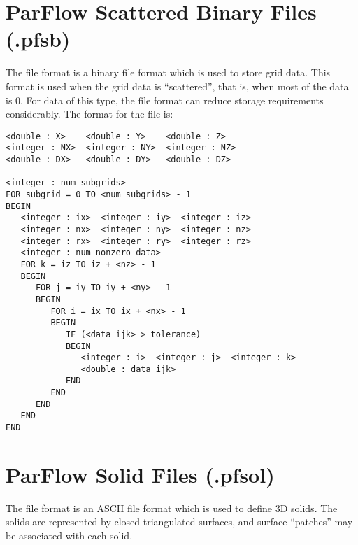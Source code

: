 
\section{ParFlow Scattered Binary Files (.pfsb)}
\label{ParFlow Scattered Binary Files (.pfsb)}

The  file format is a binary file format which is used
to store \parflow{} grid data.
This format is used when the grid data is ``scattered'', that is,
when most of the data is 0.
For data of this type, the  file format can reduce
storage requirements considerably.
The format for the file is:

\begin{display}\begin{verbatim}
<double : X>    <double : Y>    <double : Z>
<integer : NX>  <integer : NY>  <integer : NZ>
<double : DX>   <double : DY>   <double : DZ>

<integer : num_subgrids>
FOR subgrid = 0 TO <num_subgrids> - 1
BEGIN
   <integer : ix>  <integer : iy>  <integer : iz>
   <integer : nx>  <integer : ny>  <integer : nz>
   <integer : rx>  <integer : ry>  <integer : rz>
   <integer : num_nonzero_data>
   FOR k = iz TO iz + <nz> - 1
   BEGIN
      FOR j = iy TO iy + <ny> - 1
      BEGIN
         FOR i = ix TO ix + <nx> - 1
         BEGIN
            IF (<data_ijk> > tolerance)
            BEGIN
               <integer : i>  <integer : j>  <integer : k>
               <double : data_ijk>
            END
         END
      END
   END
END
\end{verbatim}\end{display}


\section{ParFlow Solid Files (.pfsol)}
\label{ParFlow Solid Files (.pfsol)}

The  file format is an ASCII file format which is
used to define 3D solids.
The solids are represented by closed triangulated surfaces,
and surface ``patches'' may be associated with each solid.

